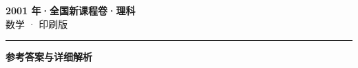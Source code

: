 \documentclass[zihao=5, a4paper]{ctexart}
\begin{document}
\begin{center}
  {\Large\bfseries 2001 年·全国新课程卷·理科}\\[4pt]
  {\large 数学 · 印刷版}
\end{center}
\medskip
{}

\par\bigskip\hrule\bigskip
{}
\begin{center}{\large\bfseries 参考答案与详细解析}\end{center}
\smallskip

\end{document}
